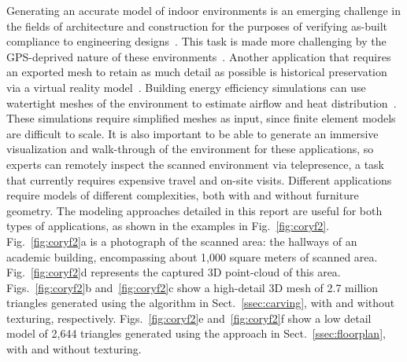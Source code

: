 \documentclass[journal]{IEEEtran}
\begin{document}
Generating an accurate model of indoor environments is an emerging challenge in the fields of architecture and construction for the purposes of verifying as-built compliance to engineering designs~\cite{Bosche10,Xiong13}.  This task is made more challenging by the GPS-deprived nature of these environments~\cite{Liang13}.  Another application that requires an exported mesh to retain as much detail as possible is historical preservation via a virtual reality model~\cite{VillageHeritage,Carving}.  Building energy efficiency simulations can use watertight meshes of the environment to estimate airflow and heat distribution~\cite{EnergyPlus}.  These simulations require simplified meshes as input, since finite element models are difficult to scale.  It is also important to be able to generate an immersive visualization and walk-through of the environment for these applications, so experts can remotely inspect the scanned environment via telepresence, a task that currently requires expensive travel and on-site visits.  Different applications require models of different complexities, both with and without furniture geometry.  The modeling approaches detailed in this report are useful for both types of applications, as shown in the examples in Fig.~\ref{fig:coryf2}.  Fig.~\ref{fig:coryf2}a is a photograph of the scanned area: the hallways of an academic building, encompassing about 1,000 square meters of scanned area.  Fig.~\ref{fig:coryf2}d represents the captured 3D point-cloud of this area.  Figs.~\ref{fig:coryf2}b and~\ref{fig:coryf2}c show a high-detail 3D mesh of 2.7 million triangles generated using the algorithm in Sect.~\ref{ssec:carving}, with and without texturing, respectively.  Figs.~\ref{fig:coryf2}e and~\ref{fig:coryf2}f show a low detail model of 2,644 triangles generated using the approach in Sect.~\ref{ssec:floorplan}, with and without texturing.
\end{document}
